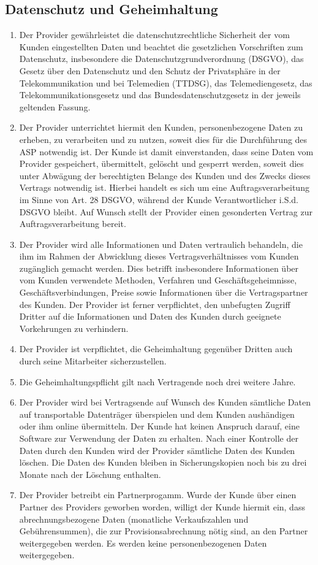 \documentclass{terms}
\begin{document}
\subsection{Datenschutz und Geheimhaltung}
\begin{enumerate}
\item Der Provider gewährleistet die datenschutzrechtliche Sicherheit der vom Kunden eingestellten Daten und beachtet die gesetzlichen Vorschriften zum Datenschutz, insbesondere die Datenschutzgrundverordnung (DSGVO), das Gesetz über den Datenschutz und den Schutz der Privatsphäre in der Telekommunikation und bei Telemedien (TTDSG), das Telemediengesetz, das Telekommunikationsgesetz und das Bundesdatenschutzgesetz in der jeweils geltenden Fassung.
\item Der Provider unterrichtet hiermit den Kunden, personenbezogene Daten zu erheben, zu verarbeiten und zu nutzen, soweit dies für die Durchführung des ASP notwendig ist. Der Kunde ist damit einverstanden, dass seine Daten vom Provider gespeichert, übermittelt, gelöscht und gesperrt werden, soweit dies unter Abwägung der berechtigten Belange des Kunden und des Zwecks dieses Vertrags notwendig ist. Hierbei handelt es sich um eine Auftragsverarbeitung im Sinne von Art. 28 DSGVO, während der Kunde Verantwortlicher i.S.d. DSGVO bleibt. Auf Wunsch stellt der Provider einen gesonderten Vertrag zur Auftragsverarbeitung bereit.
\item Der Provider wird alle Informationen und Daten vertraulich behandeln, die ihm im Rahmen der Abwicklung dieses Vertragsverhältnisses vom Kunden zugänglich gemacht werden. Dies betrifft insbesondere Informationen über vom Kunden verwendete Methoden, Verfahren und Geschäftsgeheimnisse, Geschäftsverbindungen, Preise sowie Informationen über die Vertragspartner des Kunden. Der Provider ist ferner verpflichtet, den unbefugten Zugriff Dritter auf die Informationen und Daten des Kunden durch geeignete Vorkehrungen zu verhindern.
\item Der Provider ist verpflichtet, die Geheimhaltung gegenüber Dritten auch durch seine Mitarbeiter sicherzustellen.
\item Die Geheimhaltungspflicht gilt nach Vertragende noch drei weitere Jahre. 
\item Der Provider wird bei Vertragsende auf Wunsch des Kunden sämtliche Daten auf transportable Datenträger überspielen und dem Kunden aushändigen oder ihm online übermitteln. Der Kunde hat keinen Anspruch darauf, eine Software zur Verwendung der Daten zu erhalten. Nach einer Kontrolle der Daten durch den Kunden wird der Provider sämtliche Daten des Kunden löschen. Die Daten des Kunden bleiben in Sicherungskopien noch bis zu drei Monate nach der Löschung enthalten.
\item Der Provider betreibt ein Partnerprogamm. Wurde der Kunde über einen Partner des Providers geworben worden, willigt der Kunde hiermit ein, dass abrechnungsbezogene Daten (monatliche Verkaufszahlen und Gebührensummen), die zur Provisionsabrechnung nötig sind, an den Partner weitergegeben werden. Es werden keine personenbezogenen Daten weitergegeben.
\end{enumerate}
\end{document}
